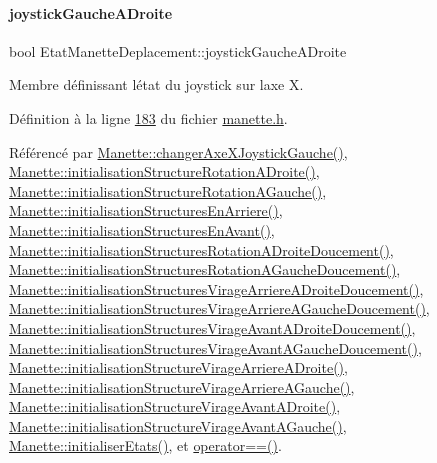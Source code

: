\paragraph{\texorpdfstring{joystick\+Gauche\+A\+Droite}{joystickGaucheADroite}}
{\footnotesize\ttfamily bool Etat\+Manette\+Deplacement\+::joystick\+Gauche\+A\+Droite}



Membre définissant l\textquotesingle{}état du joystick sur l\textquotesingle{}axe X. 



Définition à la ligne \hyperlink{manette_8h_source_l00183}{183} du fichier \hyperlink{manette_8h_source}{manette.\+h}.



Référencé par \hyperlink{manette_8cpp_source_l00421}{Manette\+::changer\+Axe\+X\+Joystick\+Gauche()}, \hyperlink{manette_8cpp_source_l00178}{Manette\+::initialisation\+Structure\+Rotation\+A\+Droite()}, \hyperlink{manette_8cpp_source_l00151}{Manette\+::initialisation\+Structure\+Rotation\+A\+Gauche()}, \hyperlink{manette_8cpp_source_l00127}{Manette\+::initialisation\+Structures\+En\+Arriere()}, \hyperlink{manette_8cpp_source_l00103}{Manette\+::initialisation\+Structures\+En\+Avant()}, \hyperlink{manette_8cpp_source_l00188}{Manette\+::initialisation\+Structures\+Rotation\+A\+Droite\+Doucement()}, \hyperlink{manette_8cpp_source_l00161}{Manette\+::initialisation\+Structures\+Rotation\+A\+Gauche\+Doucement()}, \hyperlink{manette_8cpp_source_l00296}{Manette\+::initialisation\+Structures\+Virage\+Arriere\+A\+Droite\+Doucement()}, \hyperlink{manette_8cpp_source_l00269}{Manette\+::initialisation\+Structures\+Virage\+Arriere\+A\+Gauche\+Doucement()}, \hyperlink{manette_8cpp_source_l00242}{Manette\+::initialisation\+Structures\+Virage\+Avant\+A\+Droite\+Doucement()}, \hyperlink{manette_8cpp_source_l00215}{Manette\+::initialisation\+Structures\+Virage\+Avant\+A\+Gauche\+Doucement()}, \hyperlink{manette_8cpp_source_l00286}{Manette\+::initialisation\+Structure\+Virage\+Arriere\+A\+Droite()}, \hyperlink{manette_8cpp_source_l00259}{Manette\+::initialisation\+Structure\+Virage\+Arriere\+A\+Gauche()}, \hyperlink{manette_8cpp_source_l00232}{Manette\+::initialisation\+Structure\+Virage\+Avant\+A\+Droite()}, \hyperlink{manette_8cpp_source_l00205}{Manette\+::initialisation\+Structure\+Virage\+Avant\+A\+Gauche()}, \hyperlink{manette_8cpp_source_l00023}{Manette\+::initialiser\+Etats()}, et \hyperlink{manette_8cpp_source_l00636}{operator==()}.

\mbox{\label{struct_etat_manette_deplacement_af7e92a8d8f116e2bc4a5a95386f604e7}} 
